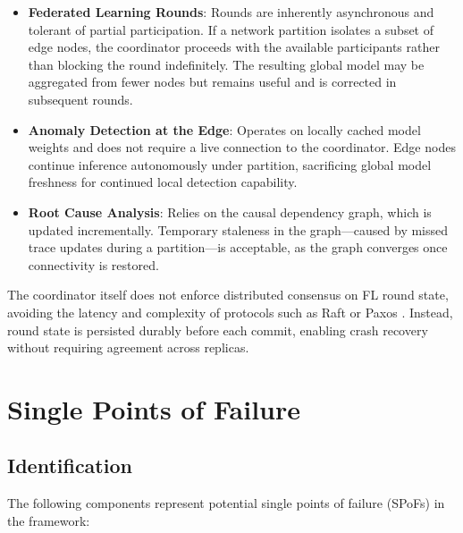 \begin{itemize}
    \item \textbf{Federated Learning Rounds}: Rounds are inherently asynchronous and
    tolerant of partial participation. If a network partition isolates a subset of
    edge nodes, the coordinator proceeds with the available participants rather than
    blocking the round indefinitely. The resulting global model may be aggregated from
    fewer nodes but remains useful and is corrected in subsequent rounds.

    \item \textbf{Anomaly Detection at the Edge}: Operates on locally cached model
    weights and does not require a live connection to the coordinator. Edge nodes
    continue inference autonomously under partition, sacrificing global model
    freshness for continued local detection capability.

    \item \textbf{Root Cause Analysis}: Relies on the causal dependency graph, which
    is updated incrementally. Temporary staleness in the graph---caused by missed
    trace updates during a partition---is acceptable, as the graph converges once
    connectivity is restored.
\end{itemize}

The coordinator itself does not enforce distributed consensus on FL round state,
avoiding the latency and complexity of protocols such as Raft or Paxos \cite{ongaro2014raft, 
lamport2001paxos}. Instead, round state is persisted durably before each commit, 
enabling crash recovery without requiring agreement across replicas.

\section{Single Points of Failure}
\label{sec:reliability_spof}

\subsection{Identification}
\label{subsec:spof_identification}

The following components represent potential single points of failure (SPoFs) in the
framework:

